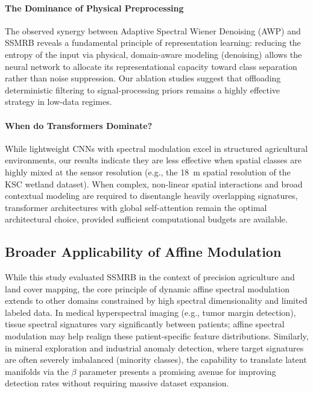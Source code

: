 \documentclass[pdflatex,sn-mathphys-num]{sn-jnl}
\theoremstyle{thmstyleone}
\theoremstyle{thmstyletwo}
\theoremstyle{thmstylethree}
\begin{document}
\paragraph{The Dominance of Physical Preprocessing}
The observed synergy between Adaptive Spectral Wiener Denoising (AWP) and SSMRB reveals a fundamental principle of representation learning: reducing the entropy of the input via physical, domain-aware modeling (denoising) allows the neural network to allocate its representational capacity toward class separation rather than noise suppression. Our ablation studies suggest that offloading deterministic filtering to signal-processing priors remains a highly effective strategy in low-data regimes.

\paragraph{When do Transformers Dominate?}
While lightweight CNNs with spectral modulation excel in structured agricultural environments, our results indicate they are less effective when spatial classes are highly mixed at the sensor resolution (e.g., the 18~m spatial resolution of the KSC wetland dataset). When complex, non-linear spatial interactions and broad contextual modeling are required to disentangle heavily overlapping signatures, transformer architectures with global self-attention remain the optimal architectural choice, provided sufficient computational budgets are available.

\subsection{Broader Applicability of Affine Modulation}
While this study evaluated SSMRB in the context of precision agriculture and land cover mapping, the core principle of dynamic affine spectral modulation extends to other domains constrained by high spectral dimensionality and limited labeled data. In medical hyperspectral imaging (e.g., tumor margin detection), tissue spectral signatures vary significantly between patients; affine spectral modulation may help realign these patient-specific feature distributions. Similarly, in mineral exploration and industrial anomaly detection, where target signatures are often severely imbalanced (minority classes), the capability to translate latent manifolds via the $\beta$ parameter presents a promising avenue for improving detection rates without requiring massive dataset expansion.
\end{document}
